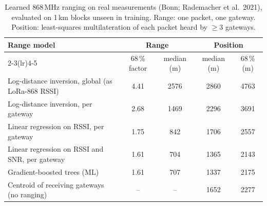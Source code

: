 \begin{table}[t]
\centering
\small
\setlength{\tabcolsep}{4pt}
\caption{Learned 868\,MHz ranging on real measurements (Bonn; Rademacher et al.\ 2021), evaluated on 1\,km blocks unseen in training. Range: one packet, one gateway. Position: least-squares multilateration of each packet heard by $\geq 3$ gateways.}
\label{tab:nohw-ml}
\begin{tabular}{lcccc}
\toprule
Range model & \multicolumn{2}{c}{Range} & \multicolumn{2}{c}{Position} \\
\cmidrule(lr){2-3}\cmidrule(lr){4-5}
 & 68\,\% factor & median (m) & median (m) & 68\,\% (m) \\
\midrule
Log-distance inversion, global (as LoRa-868 RSSI) & 4.41 & 2576 & 2860 & 4763 \\
Log-distance inversion, per gateway & 2.68 & 1469 & 2296 & 3691 \\
Linear regression on RSSI, per gateway & 1.75 & 842 & 1706 & 2557 \\
Linear regression on RSSI and SNR, per gateway & 1.61 & 704 & 1365 & 2143 \\
Gradient-boosted trees (ML) & 1.61 & 707 & 1337 & 2175 \\
Centroid of receiving gateways (no ranging) & -- & -- & 1652 & 2277 \\
\bottomrule
\end{tabular}
\end{table}
